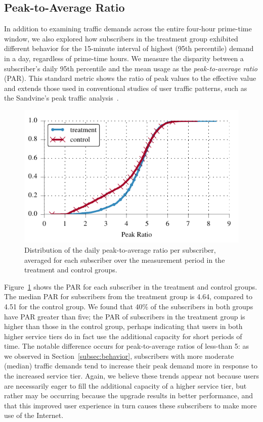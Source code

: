 \subsection{Peak-to-Average Ratio}\label{subsec:peakratio}

In addition to examining traffic demands across the entire four-hour
prime-time window, we also explored how subscribers in the treatment
group exhibited different behavior for the 15-minute interval of highest (95th percentile)
demand in a day, regardless of prime-time hours. We measure the disparity
between a subscriber's daily 95th percentile and 
the mean usage as the \emph{peak-to-average ratio}
(PAR). This standard metric
shows the ratio of peak values to the effective value and extends those used
in conventional studies of user traffic patterns, such as the Sandvine's
peak traffic analysis~\cite{sandvine20141h}. 

\begin{figure}[t]
\centering
\includegraphics[width=.49\linewidth]{figures/peakratio_cdf_mean-devices.pdf}
\caption{Distribution of the daily peak-to-average ratio per subscriber, averaged for each subscriber over the measurement period in the treatment and  control groups.}
\label{fig:CDF-peak-ratio-mean}
\end{figure}

Figure~\ref{fig:CDF-peak-ratio-mean} shows the PAR for each 
subscriber in the treatment and control groups. The median PAR
 for subscribers from the treatment group is 4.64, compared to 4.51
for the control group.
We found that 40\% of the subscribers in both groups have PAR
greater than five; the PAR of subscribers in the treatment group is higher than those in the
control group, perhaps indicating that users in both higher service tiers do
in fact use the additional capacity for short periods of time. The
notable difference occurs for peak-to-average ratios of less-than 5: as
we observed in Section~\ref{subsec:behavior}, subscribers with more
moderate (median) traffic demands tend to increase their peak demand more in
response to the increased service tier.  Again, we believe these trends
appear not because users are necessarily eager to fill the additional
capacity of a higher service tier, but rather may be occurring because the upgrade
results in better performance, and that this improved user experience in
turn causes these subscribers to make more use of the Internet.

